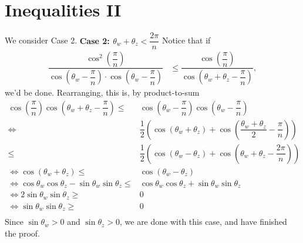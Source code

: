 \documentclass{article}
\begin{document}
\section{Inequalities II}
We consider Case 2. \newline
\textbf{Case 2: $\theta_w + \theta_z < \dfrac{2 \pi}{n}$} \newline
Notice that if 
\begin{align}
    \dfrac
    {\cos^2 \left(\dfrac{\pi}{n}\right)}
    {\cos \left( \theta_w - \dfrac{\pi}{n}\right) \cdot \cos \left( \theta_w - \dfrac{\pi}{n}\right)}
    & \le \dfrac
    {\cos \left(\dfrac{\pi}{n}\right)}
    {\cos \left( \theta_w + \theta_z - \dfrac{\pi}{n}\right)},
\end{align}
we'd be done. Rearranging, this is, by product-to-sum 
\begin{align}
    \cos \left(\dfrac{\pi}{n}\right) \cos \left( \theta_w + \theta_z - \dfrac{\pi}{n} \right)
    \le &
    \cos \left( \theta_w - \dfrac{\pi}{n} \right) \cos \left( \theta_w - \dfrac{\pi}{n} \right) \\
    \iff & \dfrac{1}{2} \left( \cos \left(\theta_w + \theta_z \right) 
    + \cos \left(\dfrac{\theta_w + \theta_z}{2} - \dfrac{\pi}{n}\right) \right) \\
    \le & \dfrac{1}{2} \left( \cos \left(\theta_w - \theta_z\right) 
    + \cos \left( \theta_w + \theta_z - \dfrac{2\pi}{n}\right) \right) \\
    \iff \cos \left(\theta_w + \theta_z \right) 
    \le & \cos \left( \theta_w - \theta_z\right) \\
    \iff \cos \theta_w \cos \theta_z - \sin \theta_w \sin \theta_z 
    \le & \cos \theta_w \cos \theta_z + \sin \theta_w \sin \theta_z \\
    \iff 2 \sin \theta_w \sin \theta_z \ge & 0 \\
    \iff \sin \theta_w \sin \theta_z \ge & 0 \\
\end{align}
Since $\sin \theta_w > 0$ and $\sin \theta_z > 0$, we are done with this case, and have finished
the proof. $\boxed{\text{ }}$
\end{document}
